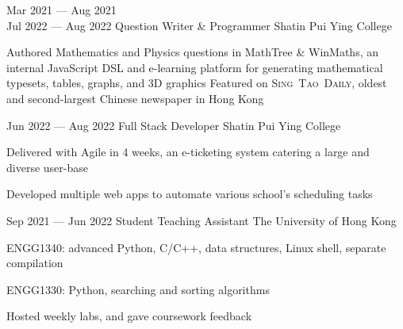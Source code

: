 \cvEntry
{Mar 2021 --- Aug 2021\\Jul 2022 --- Aug 2022 }
{Question Writer \& Programmer}
{Shatin Pui Ying College}
{
\begin{descitemize}
    \specialitem Authored Mathematics and Physics questions in MathTree \& WinMaths, an internal JavaScript DSL and e-learning platform for generating mathematical typesets, tables, graphs, and 3D graphics
    \specialitem Featured on \mbox{\scshape Sing Tao Daily}, oldest and second-largest Chinese newspaper in Hong Kong
\end{descitemize}
}

\cvEntry
{Jun 2022 --- Aug 2022}
{Full Stack Developer}
{Shatin Pui Ying College}
{
\begin{descitemize}
    \item Delivered with Agile in 4 weeks, an e-ticketing system catering a large and diverse user-base
    \item Developed multiple web apps to automate various school's scheduling tasks
\end{descitemize}
}

\cvEntry
{Sep 2021 --- Jun 2022}
{Student Teaching Assistant}
{The University of Hong Kong}
{
\begin{descitemize}
    \item ENGG1340: advanced Python, C/C++, data structures, Linux shell, separate compilation
    \item ENGG1330: Python, searching and sorting algorithms
    \item Hosted weekly labs, and gave coursework feedback
\end{descitemize}
}